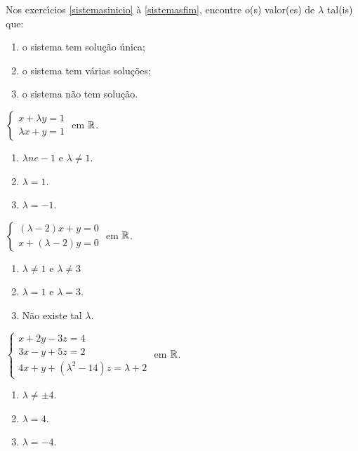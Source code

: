 \documentclass[12pt]{exam}
\begin{document}
Nos exerc{\'\i}cios \ref{sistemasinicio} \`a \ref{sistemasfim}, encontre o(s) valor(es) de $\lambda$ tal(is) que:
\begin{enumerate}[label={\alph*})]
  \item o sistema tem solu\c{c}\~ao \'unica;
  \item o sistema tem v\'arias solu\c{c}\~oes;
  \item o sistema n\~ao tem solu\c{c}\~ao.
\end{enumerate}

\begin{exercicio}\label{sistemasinicio}
  $
    \begin{cases}
      x + \lambda y = 1\\
      \lambda x + y = 1
    \end{cases}
  $
  em $\mathbb{R}$.
  \begin{solucao}
    \begin{enumerate}[label={\alph*})]
      \item $\lambda ne -1$ e $\lambda \ne 1$.
      \item $\lambda = 1$.
      \item $\lambda = -1$.
    \end{enumerate}
  \end{solucao}
\end{exercicio}

\begin{exercicio}
  $
    \begin{cases}
      (\lambda - 2)x + y = 0\\
      x + (\lambda - 2)y = 0
    \end{cases}
  $
  em $\mathbb{R}$.
  \begin{solucao}
    \begin{enumerate}[label={\alph*})]
      \item $\lambda \ne 1$ e $\lambda \ne 3$
      \item $\lambda = 1$ e $\lambda = 3$.
      \item N\~ao existe tal $\lambda$.
    \end{enumerate}
  \end{solucao}
\end{exercicio}

\begin{exercicio}
  $
    \begin{cases}
      x + 2y - 3z = 4\\
      3x - y + 5z = 2\\
      4x + y + (\lambda^2 - 14)z = \lambda + 2
    \end{cases}
  $
  em $\mathbb{R}$.
  \begin{solucao}
    \begin{enumerate}[label={\alph*})]
      \item $\lambda \ne \pm 4$.
      \item $\lambda = 4$.
      \item $\lambda = -4$.
    \end{enumerate}
  \end{solucao}
\end{exercicio}
\end{document}
